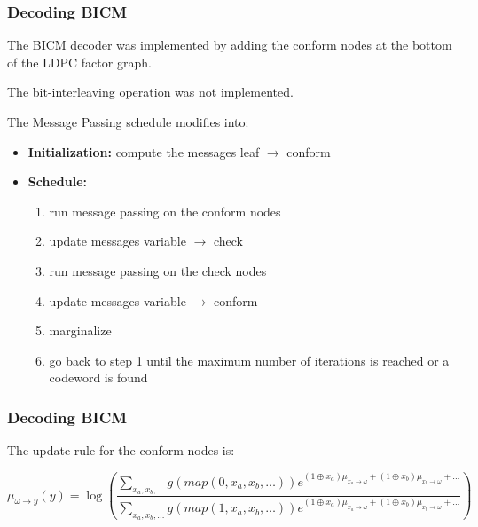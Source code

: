 \documentclass[]{beamer}
\begin{document}
\begin{frame}
\transwipe[direction=0]
\frametitle{Decoding BICM}
The BICM decoder was implemented by adding the conform nodes at the bottom of the LDPC factor graph. 

The bit-interleaving operation was not implemented.

\vspace{0.5cm}

The Message Passing schedule modifies into:
\begin{itemize}
	\item \textbf{Initialization:} compute the messages leaf $\rightarrow$ conform
	\item \textbf{Schedule:}
	\begin{enumerate}
		\item run message passing on the conform nodes
		\item update messages variable $\rightarrow$ check
		\item run message passing on the check nodes
		\item update messages variable $\rightarrow$ conform
		\item marginalize
		\item go back to step 1 until the maximum number of iterations is reached or a codeword is found
	\end{enumerate}
\end{itemize}
\end{frame}

\begin{frame}
\transwipe[direction=0]
\frametitle{Decoding BICM}
The update rule for the conform nodes is:

\begin{equation*}
\mu_{\omega \rightarrow y} (y) = \log \left ( \frac{\sum\limits_{x_a, x_b, \dots} g(map(0,x_a,x_b,\dots)) e^{(1\oplus x_a)\mu_{x_a \rightarrow \omega}+(1\oplus x_b)\mu_{x_b \rightarrow \omega}+\dots}}{\sum\limits_{x_a, x_b, \dots} g(map(1,x_a,x_b,\dots)) e^{(1\oplus x_a)\mu_{x_a \rightarrow \omega}+(1\oplus x_b)\mu_{x_b \rightarrow \omega}+\dots}} \right)
\end{equation*}

\begin{center}
\end{center}


\end{frame}
\end{document}
